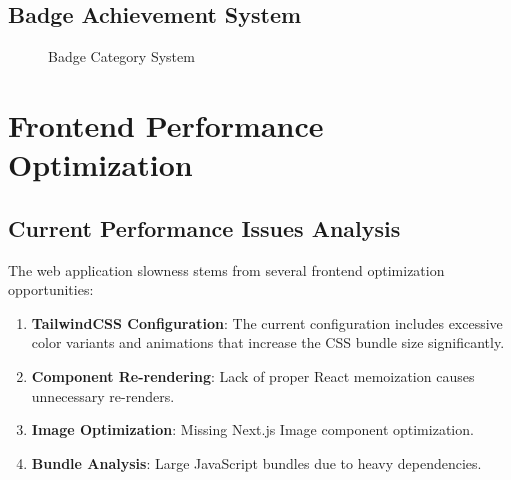 \documentclass[12pt,a4paper]{article}
\begin{document}
\subsection{Badge Achievement System}

\begin{figure}[H]
\centering
{}
\caption{Badge Category System}
\label{fig:badge-system}
\end{figure}

\section{Frontend Performance Optimization}

\subsection{Current Performance Issues Analysis}

The web application slowness stems from several frontend optimization opportunities:

\begin{enumerate}
    \item \textbf{TailwindCSS Configuration}: The current configuration includes excessive color variants and animations that increase the CSS bundle size significantly.
    \item \textbf{Component Re-rendering}: Lack of proper React memoization causes unnecessary re-renders.
    \item \textbf{Image Optimization}: Missing Next.js Image component optimization.
    \item \textbf{Bundle Analysis}: Large JavaScript bundles due to heavy dependencies.
\end{enumerate}
\end{document}
